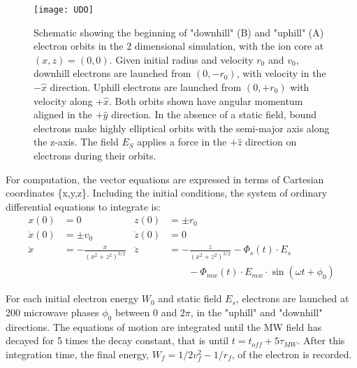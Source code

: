 \documentclass[aps,pra,preprint,groupedaddress]{revtex4-1}
\begin{document}
\begin{figure}
	\texttt{[image: UDO]}
	\caption{Schematic showing the beginning of "downhill" (B) and "uphill" (A) electron orbits in the 2 dimensional simulation, with the ion core at $(x, z) = (0, 0)$. Given initial radius and velocity $r_0$ and $v_0$, downhill electrons are launched from $(0, -r_0)$, with velocity in the $-\hat{x}$ direction. Uphill electrons are launched from $(0, +r_0)$ with velocity along $+\hat{x}$. Both orbits shown have angular momentum aligned in the $+\hat{y}$ direction. In the absence of a static field, bound electrons make highly elliptical orbits with the semi-major axis along the z-axis. The field $E_S$ applies a force in the $+\hat{z}$ direction on electrons during their orbits.}
	\label{fig:udo}
\end{figure}

For computation, the vector equations are expressed in terms of Cartesian coordinates \{x,y,z\}. Including the initial conditions, the system of ordinary differential equations to integrate is:
\begin{align*}
x(0) & = 0 & z(0) & = \pm r_0 \\
\dot{x}(0) & = \pm v_0 & \dot{z}(0) & = 0 \\
\ddot{x} & = -\frac{x}{(x^2 + z^2)^{3/2}} & \ddot{z} & = -\frac{z}{(x^2 + z^2)^{3/2}} - \Phi_s(t) \cdot E_s \\
 & & & \quad \quad - \Phi_{mw}(t) \cdot E_{mw} \cdot \sin{(\omega t + \phi_0)}
\end{align*}

For each initial electron energy $W_0$ and static field $E_s$, electrons are launched at 200 microwave phases $\phi_0$ between 0 and $2\pi$, in the "uphill" and "downhill" directions. The equations of motion are integrated until the MW field has decayed for 5 times the decay constant, that is until  $t=t_{off} + 5\tau_{MW}$. After this integration time, the final energy, $W_f = 1/2 v_f^2 - 1/r_f$, of the electron is recorded.
\end{document}
